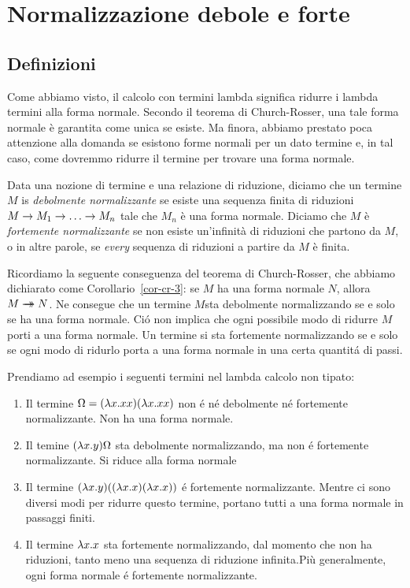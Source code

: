 \documentclass{article}
\begin{document}
\section{Normalizzazione debole e forte}

\subsection{Definizioni}

Come abbiamo visto, il calcolo con termini lambda significa ridurre i lambda
 termini alla forma normale. Secondo il teorema di Church-Rosser, una tale 
forma normale \`e garantita come unica se esiste. Ma finora, abbiamo prestato poca
 attenzione alla domanda se esistono forme normali per un dato termine e, in tal caso,
 come dovremmo ridurre il termine per trovare una forma normale.

\begin{definition}
  Data una nozione di termine e una relazione di riduzione, diciamo che un termine 
  $M$ is {\em debolmente normalizzante} se esiste una sequenza finita di riduzioni
  $M\rightarrow M_1\rightarrow\ldots\rightarrow M_n$ tale che $M_n$ \`e una forma normale.
  Diciamo che $M$ \`e {\em fortemente normalizzante} se non esiste un'infinit\`a
  di riduzioni che partono da $M$, o in altre parole, se {\em every} sequenza di riduzioni a partire da
  $M$ \`e finita. 
\end{definition}

Ricordiamo la seguente conseguenza del teorema di Church-Rosser, che 
abbiamo dichiarato come Corollario~\ref{cor-cr-3}: se $M$ ha una forma normale $N$,
allora $M\mathrel{\rightarrow\!\!\!\!\!\rightarrow} N$. Ne consegue che un termine $M$sta debolmente normalizzando
 se e solo se ha una forma normale. Ci\'o non implica che ogni possibile modo di 
ridurre $M$ porti a una forma normale. Un termine si sta fortemente normalizzando
 se e solo se ogni modo di ridurlo porta a una forma normale in una certa quantit\'a di passi.

Prendiamo ad esempio i seguenti termini nel lambda calcolo non tipato:
\begin{enumerate}
\item Il termine $\Omega=(\lambda x.xx)(\lambda x.xx)$ non \'e n\'e debolmente n\'e
   fortemente normalizzante. Non ha una forma normale.
\item Il temine $(\lambda x.y)\Omega$ sta debolmente normalizzando, ma non \'e
   fortemente normalizzante. Si riduce alla forma normale
\item Il termine $(\lambda x.y)((\lambda x.x)(\lambda x.x))$ \'e fortemente
   normalizzante. Mentre ci sono diversi modi per ridurre questo
   termine, portano tutti a una forma normale in passaggi finiti.
\item Il termine $\lambda x.x$ sta fortemente normalizzando, dal momento che non ha
   riduzioni, tanto meno una sequenza di riduzione infinita.Più
   generalmente, ogni forma normale \'e fortemente normalizzante.
\end{enumerate}
\end{document}
